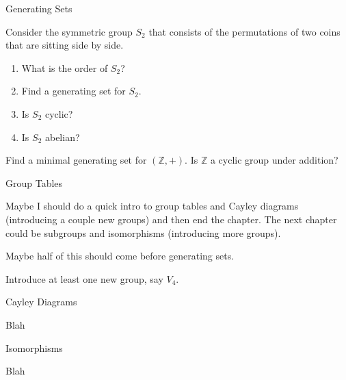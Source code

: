 \begin{section}{Generating Sets}
\begin{problem}\label{prob:introducing_S2}
Consider the symmetric group $S_2$ that consists of the permutations of two coins that are sitting side by side.
\begin{enumerate}[label=\rm{(\alph*)}]
\item What is the order of $S_2$?
\item Find a generating set for $S_2$.
\item Is $S_2$ cyclic?
\item Is $S_2$ abelian?
\end{enumerate}
\end{problem}

\begin{problem}
Find a minimal generating set for $(\mathbb{Z},+)$.  Is $\mathbb{Z}$ a cyclic group under addition?
\end{problem}

\end{section}


\begin{section}{Group Tables}


Maybe I should do a quick intro to group tables and Cayley diagrams (introducing a couple new groups) and then end the chapter.  The next chapter could be subgroups and isomorphisms (introducing more groups).

Maybe half of this should come before generating sets.

Introduce at least one new group, say $V_4$.

\end{section}


\begin{section}{Cayley Diagrams}


Blah

\end{section}


\begin{section}{Isomorphisms}


Blah

\end{section}

